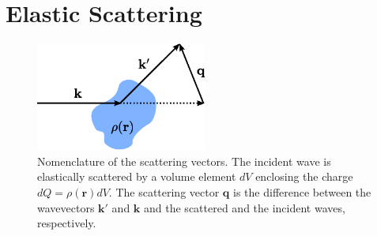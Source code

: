 \section{Elastic Scattering}
\begin{figure}
\centering
\includegraphics[width=0.5\textwidth]{diffraction/figures/scattering_vectors.eps}
\caption{Nomenclature of the scattering vectors. The incident wave is elastically scattered by a volume element $dV$ enclosing the charge $dQ = \rho(\mathbf{r}) dV$. The scattering vector $\mathbf{q}$ is the difference between the wavevectors $\mathbf{k}'$ and $\mathbf{k}$ and the scattered and the incident waves, respectively.\label{fig:elastic_scattering_vectors}}
\end{figure}

